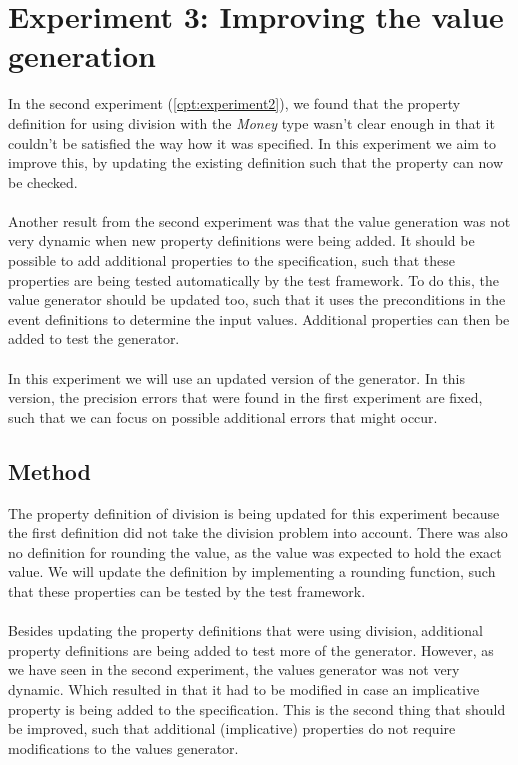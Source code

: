 \chapter{Experiment 3: Improving the value generation}
\label{cpt:experiment3}
In the second experiment (\autoref{cpt:experiment2}), we found that the property
definition for using division with the \textit{Money} type wasn't clear enough
in that it couldn't be satisfied the way how it was specified. In this
experiment we aim to improve this, by updating the existing definition such that
the property can now be checked.\\
\\
Another result from the second experiment was that the value generation was not
very dynamic when new property definitions were being added. It should be possible to add
additional properties to the specification, such that these properties are being tested
automatically by the test framework. To do this, the value generator should be
updated too, such that it uses the preconditions in the event definitions to
determine the input values. Additional properties can then be added to test
the generator.\\
\\
In this experiment we will use an updated version of the generator. In this
version, the precision errors that were found in the first experiment are fixed,
such that we can focus on possible additional errors that might occur.

\section{Method}
The property definition of division is being updated for this experiment because
the first definition did not take the division problem into account. There was
also no definition for rounding the value, as the value was expected to hold the
exact value. We will update the definition by implementing a rounding function,
such that these properties can be tested by the test
framework.\\
\\
Besides updating the property definitions that were using division, additional
property definitions are being added to test more of the generator. However, as
we have seen in the second experiment, the values generator was not very
dynamic. Which resulted in that it had to be modified in case an implicative
property is being added to the specification. This is the second thing that
should be improved, such that additional (implicative) properties do not require
modifications to the values generator.

